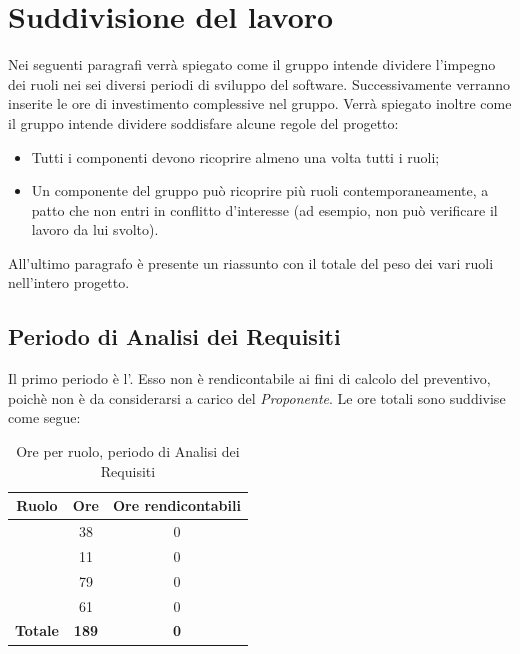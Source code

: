 \newpage
\section{Suddivisione del lavoro}
Nei seguenti paragrafi verrà spiegato come il gruppo intende dividere l'impegno dei ruoli nei sei diversi periodi di sviluppo del software. Successivamente verranno inserite le ore di investimento complessive nel gruppo. Verrà spiegato inoltre come il gruppo intende dividere soddisfare alcune regole del progetto:
\begin{itemize}
	\item Tutti i componenti devono ricoprire almeno una volta tutti i ruoli; 
	\item Un componente del gruppo può ricoprire più ruoli contemporaneamente, a patto che non entri in conflitto d'interesse (ad esempio, non può verificare il lavoro da lui svolto).
\end{itemize}

All'ultimo paragrafo è presente un riassunto con il totale del peso dei vari ruoli nell'intero progetto.

\subsection{Periodo di Analisi dei Requisiti}
Il primo periodo è l'\AdR. Esso non è rendicontabile ai fini di calcolo del preventivo, poichè non è da considerarsi a carico del \textit{Proponente}. Le ore totali sono suddivise come segue:

\begin{table}[H]
	\begin{center}
		\begin{tabular}{|c|c|c|}
			\hline
			\textbf{Ruolo}	& \textbf{Ore}	& \textbf{Ore rendicontabili} \\
			\hline
			\Res	&	38	&  0 \\
			\hline
			\Amm	&	11	&  0 \\
			\hline
			\Ana	&	79	&  0 \\
			\hline
			\Ver	&	61	&  0 \\
			\hline
			\textbf{Totale} & \textbf{189} & \textbf{0} \\
			\hline
		\end{tabular}
	\end{center}
	\caption{Ore per ruolo, periodo di Analisi dei Requisiti}
\end{table}

